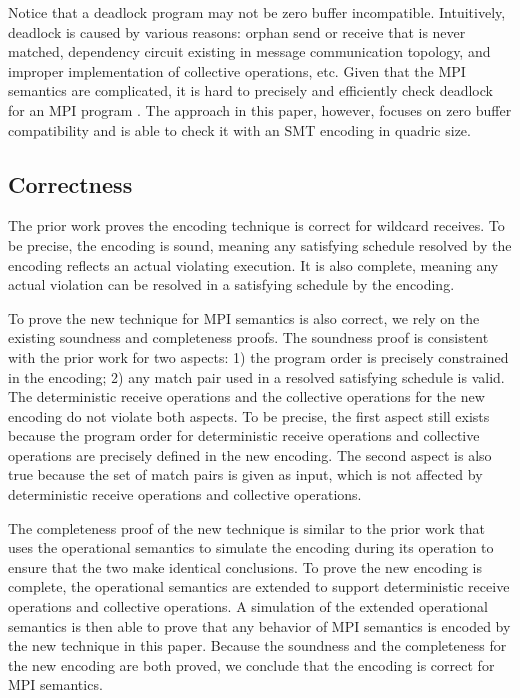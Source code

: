 Notice that a deadlock program may not be zero buffer incompatible. Intuitively, deadlock is caused by various reasons: orphan send or receive that is never matched, dependency circuit existing in message communication topology, and improper implementation of collective operations, etc. Given that the MPI semantics are complicated, it is hard to precisely and efficiently check deadlock for an MPI program \cite{}. The approach in this paper, however, focuses on zero buffer compatibility and is able to check it with an SMT encoding in quadric size.  




\subsection{Correctness}
The prior work \cite{DBLP:conf/kbse/HuangMM13} proves the encoding technique is correct for wildcard receives. To be precise, the encoding is sound, meaning any satisfying schedule resolved by the encoding reflects an actual violating execution. It is also complete, meaning any actual violation can be resolved in a satisfying schedule by the encoding. 

To prove the new technique for MPI semantics is also correct, we rely on the existing soundness and completeness proofs. The soundness proof is consistent with the prior work for two aspects: 1) the program order is precisely constrained in the encoding; 2) any match pair used in a resolved satisfying schedule is valid. The deterministic receive operations and the collective operations for the new encoding do not violate both aspects. To be precise, the first aspect still exists because the program order for deterministic receive operations and collective operations are precisely defined in the new encoding. The second aspect is also true because the set of match pairs is given as input, which is not affected by deterministic receive operations and collective operations. 

The completeness proof of the new technique is similar to the prior work that uses the operational semantics to simulate the encoding during its operation to ensure that the two make identical conclusions. To prove the new encoding is complete, the operational semantics are extended to support deterministic receive operations and collective operations. A simulation of the extended operational semantics is then able to prove that any behavior of MPI semantics is encoded by the new technique in this paper. Because the soundness and the completeness for the new encoding are both proved, we conclude that the encoding is correct for MPI semantics. 

